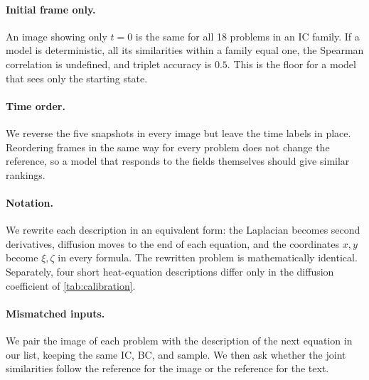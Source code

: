 \paragraph{Initial frame only.}
An image showing only $t=0$ is the same for all 18 problems in an IC family. If a model is deterministic, all its similarities within a family equal one, the Spearman correlation is undefined, and triplet accuracy is $0.5$. This is the floor for a model that sees only the starting state.

\paragraph{Time order.}
We reverse the five snapshots in every image but leave the time labels in place. Reordering frames in the same way for every problem does not change the reference, so a model that responds to the fields themselves should give similar rankings.

\paragraph{Notation.}
We rewrite each description in an equivalent form: the Laplacian becomes second derivatives, diffusion moves to the end of each equation, and the coordinates $x,y$ become $\xi,\zeta$ in every formula. The rewritten problem is mathematically identical. Separately, four short heat-equation descriptions differ only in the diffusion coefficient of \cref{tab:calibration}.

\paragraph{Mismatched inputs.}
We pair the image of each problem with the description of the next equation in our list, keeping the same IC, BC, and sample. We then ask whether the joint similarities follow the reference for the image or the reference for the text.
